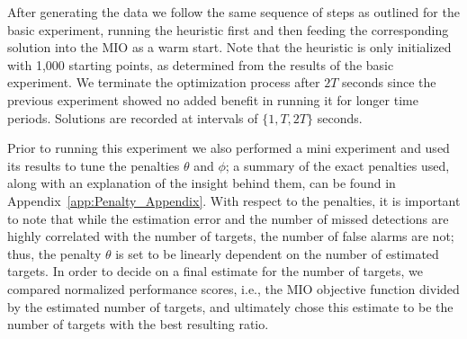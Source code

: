 After generating the data we follow the same sequence of steps as outlined for the basic experiment, running the heuristic first and then feeding the corresponding solution into the MIO as a warm start. Note that the heuristic is only initialized with 1,000 starting points, as determined from the results of the basic experiment. We terminate the optimization process after $2T$ seconds since the previous experiment showed no added benefit in running it for longer time periods. Solutions are recorded at intervals of $\{1,T,2T\}$ seconds. 

Prior to running this experiment we also performed a mini experiment and used its results to tune the penalties $\theta$ and $\phi$; a summary of the exact penalties used, along with an explanation of the insight behind them, can be found in Appendix~\ref{app:Penalty_Appendix}. With respect to the penalties, it is important to note that while the estimation error and the number of missed detections are highly correlated with the number of targets, the number of false alarms are not; thus, the penalty $\theta$ is set to be linearly dependent on the number of estimated targets. In order to decide on a final estimate for the number of targets, we compared normalized performance scores, i.e., the MIO objective function divided by the estimated number of targets, and ultimately chose this estimate to be the number of targets with the best resulting ratio. 

